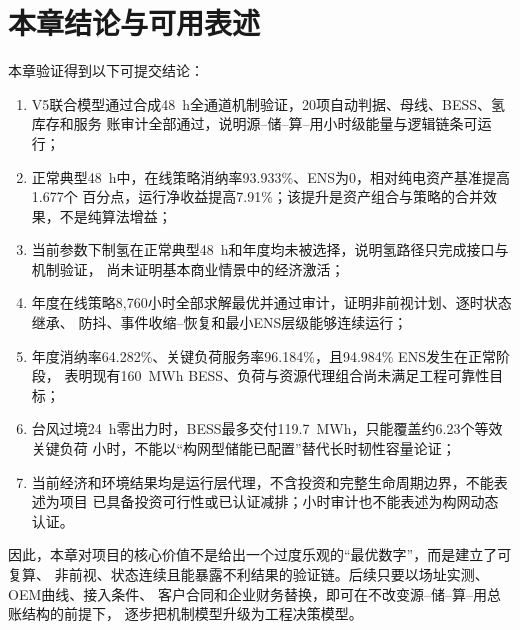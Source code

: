 \section{本章结论与可用表述}

本章验证得到以下可提交结论：
\begin{enumerate}[label=(\arabic*)]
\item V5联合模型通过合成48~h全通道机制验证，20项自动判据、母线、BESS、氢库存和服务
      账审计全部通过，说明源--储--算--用小时级能量与逻辑链条可运行；
\item 正常典型48~h中，在线策略消纳率93.933\%、ENS为0，相对纯电资产基准提高1.677个
      百分点，运行净收益提高7.91\%；该提升是资产组合与策略的合并效果，不是纯算法增益；
\item 当前参数下制氢在正常典型48~h和年度均未被选择，说明氢路径只完成接口与机制验证，
      尚未证明基本商业情景中的经济激活；
\item 年度在线策略8,760小时全部求解最优并通过审计，证明非前视计划、逐时状态继承、
      防抖、事件收缩--恢复和最小ENS层级能够连续运行；
\item 年度消纳率64.282\%、关键负荷服务率96.184\%，且94.984\% ENS发生在正常阶段，
      表明现有160~MWh BESS、负荷与资源代理组合尚未满足工程可靠性目标；
\item 台风过境24~h零出力时，BESS最多交付119.7~MWh，只能覆盖约6.23个等效关键负荷
      小时，不能以“构网型储能已配置”替代长时韧性容量论证；
\item 当前经济和环境结果均是运行层代理，不含投资和完整生命周期边界，不能表述为项目
      已具备投资可行性或已认证减排；小时审计也不能表述为构网动态认证。
\end{enumerate}

因此，本章对项目的核心价值不是给出一个过度乐观的“最优数字”，而是建立了可复算、
非前视、状态连续且能暴露不利结果的验证链。后续只要以场址实测、OEM曲线、接入条件、
客户合同和企业财务替换\assumptiontag，即可在不改变源--储--算--用总账结构的前提下，
逐步把机制模型升级为工程决策模型。
